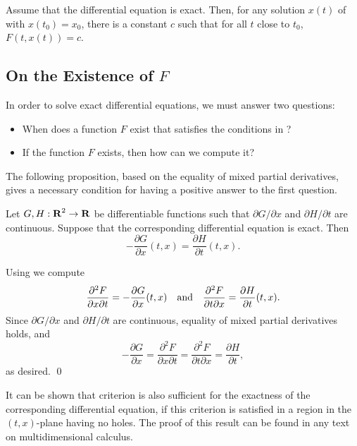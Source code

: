 \documentclass{ximera}
\begin{document}
\begin{thm} \label{thm:exact}
Assume that the differential equation  is exact.  Then, for any 
solution $x(t)$ of  with $x(t_0)=x_0$, there is a constant $c$ 
such that for all $t$ close to $t_0$, $F(t,x(t)) = c$.
\end{thm}

\subsection*{On the Existence of $F$}

In order to solve exact differential equations,
 we must answer two 
questions: 
\begin{itemize}
\item When does a function $F$ exist that satisfies the 
conditions in ?
\item If the function $F$ exists, then how can we compute it?
\end{itemize}
The following proposition, based on the equality of mixed partial derivatives, 
gives a necessary condition for having a positive answer to the first question.

\begin{prop} \label{prop:exact}
Let $G,H:\mbox{$\bf{R}$}^2\to\mbox{$\bf{R}$}$ be differentiable functions such that
$\partial G/\partial x$ and $\partial H/\partial t$ are
continuous.  Suppose that the corresponding differential
equation  is exact.  Then
\begin{equation} \label{eq:Gy=Hs}
-\frac{\partial G}{\partial x} (t,x) = \frac{\partial H}{\partial
t} (t,x).
\end{equation}
\end{prop}

\proof Using  we compute
\[
\frac{\partial^2 F}{\partial x\partial t} = 
-\frac{\partial G}{\partial x} (t,x) \quad\mbox{and}\quad 
\frac{\partial^2 F}{\partial t\partial x} = 
\frac{\partial H}{\partial t} (t,x).
\]
Since $\partial G/\partial x$ and $\partial H/\partial t$ are
continuous, equality of mixed partial derivatives holds, and
\[
-\frac{\partial G}{\partial x} = 
\frac{\partial^2 F}{\partial x\partial t} =
\frac{\partial^2 F}{\partial t\partial x} =
\frac{\partial H}{\partial t},
\]
as desired. \qed

\begin{rmk} \label{rmk:exact}
{\rm It can be shown that criterion  is also
sufficient for the exactness of the corresponding differential
equation, if this criterion is satisfied in a region in the
$(t,x)$-plane having no holes. The proof of this result can be
found in any text on multidimensional calculus.}
\end{rmk}
\end{document}
